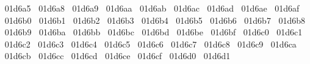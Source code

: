 {  ^^^^^^01d6a5%
  ^^^^^^01d6a8%
  ^^^^^^01d6a9%
  ^^^^^^01d6aa%
  ^^^^^^01d6ab%
  ^^^^^^01d6ac%
  ^^^^^^01d6ad%
  ^^^^^^01d6ae%
  ^^^^^^01d6af%
  ^^^^^^01d6b0%
  ^^^^^^01d6b1%
  ^^^^^^01d6b2%
  ^^^^^^01d6b3%
  ^^^^^^01d6b4%
  ^^^^^^01d6b5%
  ^^^^^^01d6b6%
  ^^^^^^01d6b7%
  ^^^^^^01d6b8%
  ^^^^^^01d6b9%
  ^^^^^^01d6ba%
  ^^^^^^01d6bb%
  ^^^^^^01d6bc%
  ^^^^^^01d6bd%
  ^^^^^^01d6be%
  ^^^^^^01d6bf%
  ^^^^^^01d6c0%
  ^^^^^^01d6c1%
  ^^^^^^01d6c2%
  ^^^^^^01d6c3%
  ^^^^^^01d6c4%
  ^^^^^^01d6c5%
  ^^^^^^01d6c6%
  ^^^^^^01d6c7%
  ^^^^^^01d6c8%
  ^^^^^^01d6c9%
  ^^^^^^01d6ca%
  ^^^^^^01d6cb%
  ^^^^^^01d6cc%
  ^^^^^^01d6cd%
  ^^^^^^01d6ce%
  ^^^^^^01d6cf%
  ^^^^^^01d6d0%
  ^^^^^^01d6d1%
}
